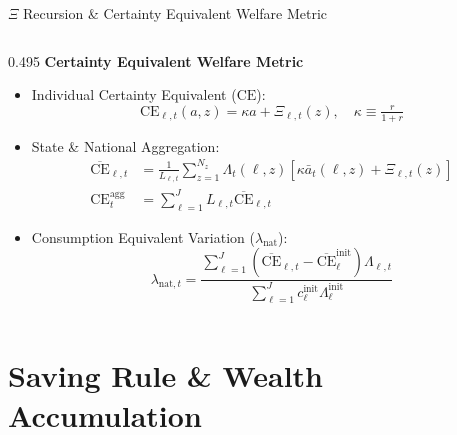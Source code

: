 \documentclass[aspectratio=169, 10pt]{beamer}
\begin{document}
\begin{frame}{$\Xi$ Recursion \& Certainty Equivalent Welfare Metric \label{backup:xi_ce_metric}}
\begin{columns}[T]
        \begin{column}{0.495\textwidth}
            \textbf{\small Certainty Equivalent Welfare Metric}
            \vspace{0.04cm}
            \begin{itemize}\scriptsize\setlength{\itemsep}{2pt}
                \item Individual Certainty Equivalent ($\text{CE}$):
                $$\text{CE}_{\ell,t}(a, z) = \kappa a + \Xi_{\ell,t}(z), \quad \kappa \equiv \tfrac{r}{1+r}$$
                \item State \& National Aggregation:
                {\tiny
                \begin{align*}
                \overline{\text{CE}}_{\ell,t} &= \tfrac{1}{L_{\ell,t}} \sum_{z=1}^{N_z} \Lambda_t(\ell, z) \left[ \kappa \bar{a}_t(\ell, z) + \Xi_{\ell,t}(z) \right] \\
                \text{CE}_t^{\text{agg}} &= \sum_{\ell=1}^J L_{\ell,t} \overline{\text{CE}}_{\ell,t}
                \end{align*}
                }
                \item Consumption Equivalent Variation ($\lambda_{\text{nat}}$):
                {\tiny
                $$\lambda_{\text{nat}, t} = \frac{\sum_{\ell=1}^J (\overline{\text{CE}}_{\ell,t} - \overline{\text{CE}}_\ell^{\text{init}}) \Lambda_{\ell,t}}{\sum_{\ell=1}^J c_\ell^{\text{init}} \Lambda_\ell^{\text{init}}}$$
                }
            \end{itemize}
        \end{column}
    \end{columns}
\end{frame}

\section{Saving Rule \& Wealth Accumulation}
\end{document}
